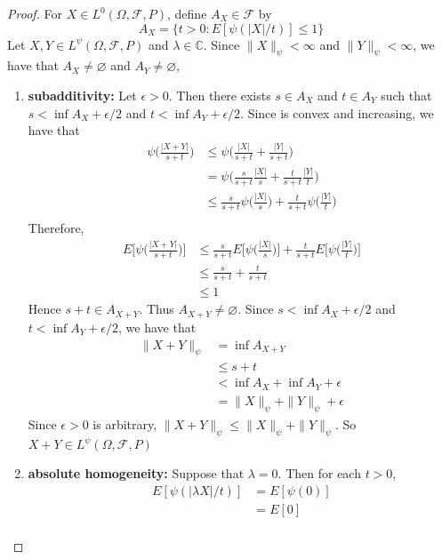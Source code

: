 \documentclass[12pt]{amsart}
\theoremstyle{definition}
\newcommand{\lam}{\lambda}
\newcommand{\ep}{\epsilon}
\newcommand{\Om}{\Omega}
\newcommand{\C}{\mathbb{C}}
\newcommand{\MF}{\mathcal{F}}
\begin{document}
	\begin{proof}
		For $X \in L^0(\Om, \MF, P)$, define $A_X \in \MF$ by 
		$$A_X = \{t > 0 : E [\psi(|X|/t)] \leq 1\}$$
		Let $X, Y \in L^{\psi}(\Om, \MF, P)$ and $\lam \in \C$. Since $\|X\|_{\psi} < \infty$ and $\|Y\|_{\psi} < \infty$, we have that $A_X \neq \varnothing$ and $A_Y \neq \varnothing$,
		\begin{enumerate}
			\item \textbf{subadditivity:} Let $\ep > 0$. Then there exists $s \in A_X$ and $t \in A_Y$ such that $s < \inf A_X + \ep/2$ and $t < \inf A_Y + \ep/2$. Since is convex and increasing, we have that
			\begin{align*}
				\psi \bigg( \frac{|X+Y|}{s +t} \bigg) 
				& \leq \psi \bigg( \frac{|X|}{s +t} +  \frac{|Y|}{s +t} \bigg) \\
				& = \psi \bigg( \frac{s}{s + t}\frac{|X|}{s} + \frac{t}{s + t}\frac{|Y|}{t} \bigg) \\
				& \leq \frac{s}{s + t} \psi \bigg( \frac{|X|}{s} \bigg) + \frac{t}{s + t} \psi \bigg( \frac{|Y|}{t} \bigg) \\
			\end{align*}
			Therefore, 
			\begin{align*}
				E\bigg[ \psi \bigg( \frac{|X+Y|}{s +t} \bigg)  \bigg]
				& \leq  \frac{s}{s + t} E \bigg[ \psi \bigg( \frac{|X|}{s} \bigg) \bigg] +  \frac{t}{s + t} E \bigg[ \psi \bigg( \frac{|Y|}{t} \bigg) \bigg] \\
				& \leq  \frac{s}{s + t} +  \frac{t}{s + t} \\
				& \leq 1
			\end{align*}
			Hence $s+t \in A_{X+Y}$. Thus $A_{X+Y} \neq \varnothing$. Since $s < \inf A_X + \ep/2$ and $t < \inf A_Y + \ep/2$, we have that 
			\begin{align*}
				\|X + Y\|_{\psi}
				& = \inf A_{X+Y} \\
				& \leq s + t \\ 
				& < \inf A_X + \inf A_Y + \ep \\
				& = \|X\|_{\psi} + \|Y \|_{\psi} + \ep
			\end{align*}
			Since $\ep >0$ is arbitrary, $	\|X + Y\|_{\psi} \leq \|X\|_{\psi} + \|Y \|_{\psi}$. So $X+Y \in L^{\psi}(\Om, \MF, P)$
			\item \textbf{absolute homogeneity:} Suppose that $\lam = 0$. Then for each $t >0$, 
			\begin{align*}
				E [\psi(|\lam X|/t)] 
				& = E[\psi(0)]\\
				& = E[0] \\

\end{align*}
\end{enumerate}
\end{proof}
\end{document}
